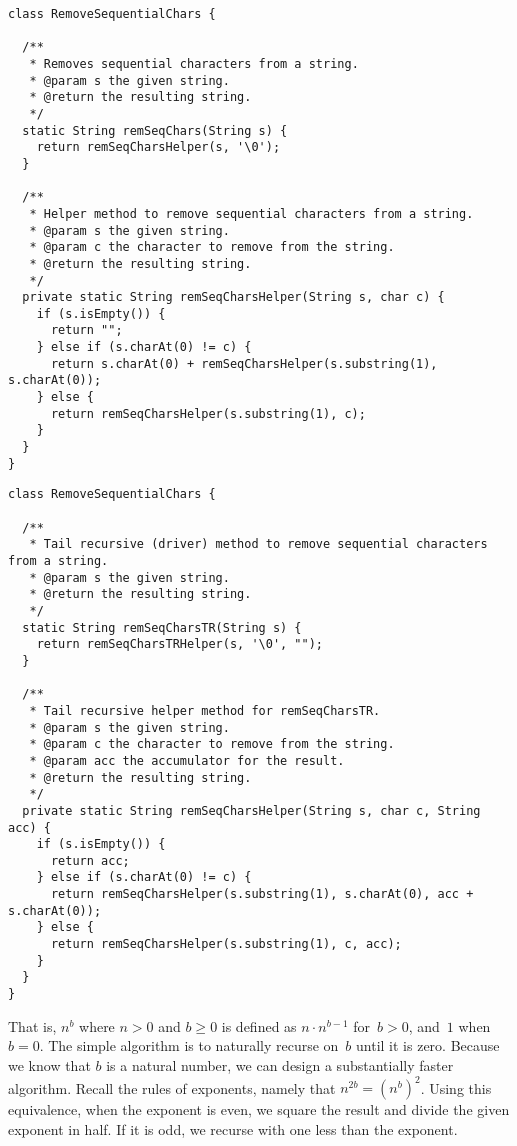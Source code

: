 \begin{lstlisting}[language=MyJava]
class RemoveSequentialChars {

  /**
   * Removes sequential characters from a string.
   * @param s the given string.
   * @return the resulting string.
   */
  static String remSeqChars(String s) {
    return remSeqCharsHelper(s, '\0');
  }

  /**
   * Helper method to remove sequential characters from a string.
   * @param s the given string.
   * @param c the character to remove from the string.
   * @return the resulting string.
   */
  private static String remSeqCharsHelper(String s, char c) {
    if (s.isEmpty()) {
      return "";
    } else if (s.charAt(0) != c) {
      return s.charAt(0) + remSeqCharsHelper(s.substring(1), s.charAt(0));
    } else {
      return remSeqCharsHelper(s.substring(1), c);
    }
  }
}
\end{lstlisting}

\begin{lstlisting}[language=MyJava]
class RemoveSequentialChars {

  /**
   * Tail recursive (driver) method to remove sequential characters from a string.
   * @param s the given string.
   * @return the resulting string.
   */
  static String remSeqCharsTR(String s) {
    return remSeqCharsTRHelper(s, '\0', "");
  }

  /**
   * Tail recursive helper method for remSeqCharsTR.
   * @param s the given string.
   * @param c the character to remove from the string.
   * @param acc the accumulator for the result.
   * @return the resulting string.
   */
  private static String remSeqCharsHelper(String s, char c, String acc) {
    if (s.isEmpty()) {
      return acc;
    } else if (s.charAt(0) != c) {
      return remSeqCharsHelper(s.substring(1), s.charAt(0), acc + s.charAt(0));
    } else {
      return remSeqCharsHelper(s.substring(1), c, acc);
    }
  }
}
\end{lstlisting}

That is, $n^b$ where $n > 0$ and $b \geq 0$ is defined as $n \cdot n^{b-1}$ for~$b > 0$, and~$1$ when~$b=0$.
The simple algorithm is to naturally recurse on~$b$ until it is zero. 
Because we know that $b$ is a natural number, we can design a substantially faster algorithm.
Recall the rules of exponents, namely that $n^{2b} = (n^b)^2$. 
Using this equivalence, when the exponent is even, we square the result and divide the given exponent in half.
If it is odd, we recurse with one less than the exponent.

